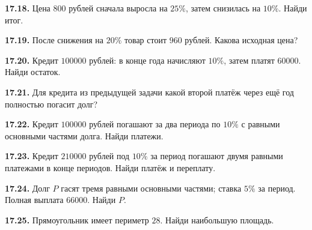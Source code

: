 \noindent\begin{minipage}[t]{\linewidth}\textbf{17.18.} Цена \(800\) рублей сначала выросла на \(25\%\), затем снизилась на \(10\%\). Найди итог.\par\end{minipage}\par
\noindent\begin{minipage}[t]{\linewidth}\textbf{17.19.} После снижения на \(20\%\) товар стоит \(960\) рублей. Какова исходная цена?\par\end{minipage}\par
\noindent\begin{minipage}[t]{\linewidth}\textbf{17.20.} Кредит \(100000\) рублей: в конце года начисляют \(10\%\), затем платят \(60000\). Найди остаток.\par\end{minipage}\par
\noindent\begin{minipage}[t]{\linewidth}\textbf{17.21.} Для кредита из предыдущей задачи какой второй платёж через ещё год полностью погасит долг?\par\end{minipage}\par
\noindent\begin{minipage}[t]{\linewidth}\textbf{17.22.} Кредит \(100000\) рублей погашают за два периода по \(10\%\) с равными основными частями долга. Найди платежи.\par\end{minipage}\par
\noindent\begin{minipage}[t]{\linewidth}\textbf{17.23.} Кредит \(210000\) рублей под \(10\%\) за период погашают двумя равными платежами в конце периодов. Найди платёж и переплату.\par\end{minipage}\par
\noindent\begin{minipage}[t]{\linewidth}\textbf{17.24.}\starmark{} Долг \(P\) гасят тремя равными основными частями; ставка \(5\%\) за период. Полная выплата \(66000\). Найди \(P\).\par\end{minipage}\par
\noindent\begin{minipage}[t]{\linewidth}\textbf{17.25.} Прямоугольник имеет периметр \(28\). Найди наибольшую площадь.\par\end{minipage}\par

